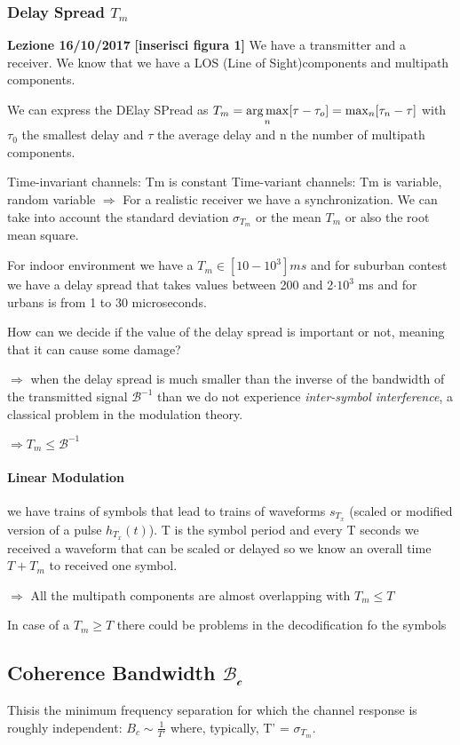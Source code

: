 \subsubsection{Delay Spread $T_m$}
\textbf{Lezione 16/10/2017}
\textbf{[inserisci figura 1]}
We have a transmitter and a receiver.
We know that we have a LOS (Line of Sight)components and multipath components.

We can express the DElay SPread as $T_m = \operatorname*{arg\,max}\limits_n[\tau - \tau_o] = \max_n[\tau_n - \tau]$ with $\tau_0$ the smallest delay and $\tau$ the average delay and n the number of multipath components.

Time-invariant channels: Tm is constant
Time-variant channels: Tm is variable, random variable
$\Rightarrow$ For a realistic receiver we have a synchronization. 
We can take into account the standard deviation $\sigma_{T_m}$ or the mean $T_m$ or also the root mean square. 

For indoor environment we have a $T_m \in [10-10^3]ms$ and for suburban contest we have a delay spread that takes values between 200 and 2$\cdot 10^3$ ms and for urbans is from 1 to 30 microseconds. 

How can we decide if the value of the delay spread is important or not, meaning that it can cause some damage?

$\Rightarrow$ when the delay spread is much smaller than the inverse of the bandwidth of the transmitted signal $\mathcal{B}^{-1}$ than we do not experience \textit{inter-symbol interference}, a classical problem in the modulation theory.   

$\Rightarrow T_m \leq \mathcal{B}^{-1}$

\paragraph{Linear Modulation}
we have trains of symbols that lead to trains of waveforms $s_{T_x}$ (scaled or modified version of a pulse $h_{T_x}(t)$). T is the symbol period and every T seconds we received a waveform that can be scaled or delayed so we know an overall time $T + T_m$ to received one symbol. 

$\Rightarrow$ All the multipath components are almost overlapping with $T_m \leq T$

In case of a $T_m \geq T$ there could be problems in the decodification fo the symbols

\subsection{Coherence Bandwidth $\mathcal{B_c}$}
Thisis the minimum frequency separation for which the channel response is roughly independent: $B_c \sim \frac{1}{T'}$ where, typically, T' = $\sigma_{T_m}$.

